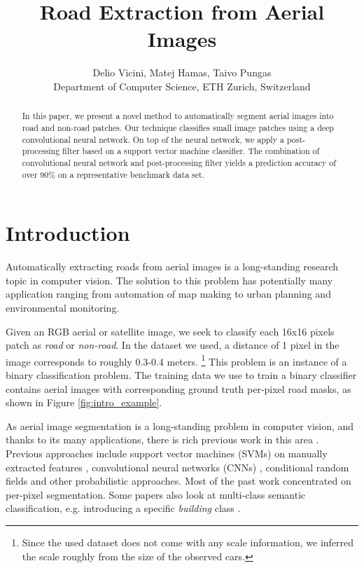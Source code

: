\documentclass[10pt,conference,compsocconf]{IEEEtran}
\begin{document}
\title{Road Extraction from Aerial Images}
\author{
  Delio Vicini, Matej Hamas, Taivo Pungas\\
  Department of Computer Science, ETH Zurich, Switzerland
}

\maketitle

\begin{abstract}
In this paper, we present a novel method to automatically segment aerial images into road and non-road patches. Our technique classifies small image patches using a deep convolutional neural network. On top of the neural network, we apply a post-processing filter based on a support vector machine classifier. The combination of convolutional neural network and post-processing filter yields a prediction accuracy of over 90\% on a representative benchmark data set.
\end{abstract}

\section{Introduction}
\label{sec:intro}

Automatically extracting roads from aerial images is a long-standing research topic in computer vision. The solution to this problem has potentially many application ranging from automation of map making to urban planning and environmental monitoring.

Given an RGB aerial or satellite image, we seek to classify each 16x16 pixels patch as \textit{road} or \textit{non-road}. In the dataset we used, a distance of 1 pixel in the image corresponds to roughly 0.3-0.4 meters. \footnote{Since the used dataset does not come with any scale information, we inferred the scale roughly from the size of the observed cars.} This problem is an instance of a binary classification problem. The training data we use to train a binary classifier contains aerial images with corresponding ground truth per-pixel road masks, as shown in Figure \ref{fig:intro_example}.

\par
As aerial image segmentation is a long-standing problem in computer vision, and thanks to its many applications, there is rich previous work in this area \cite{Huang.2002} \cite{MnihThesis.2013} \cite{Long.2014} \cite{Montoya.2015} \cite{Saito.2015}. Previous approaches include support vector machines (SVMs) on manually extracted features \cite{Huang.2002}, convolutional neural networks (CNNs) \cite{Long.2014} \cite{Saito.2015}, conditional random fields \cite{Montoya.2015} and other probabilistic approaches. Most of the past work concentrated on per-pixel segmentation. Some papers also look at multi-class semantic classification, e.g. introducing a specific \textit{building} class \cite{Saito.2015}.
\end{document}
